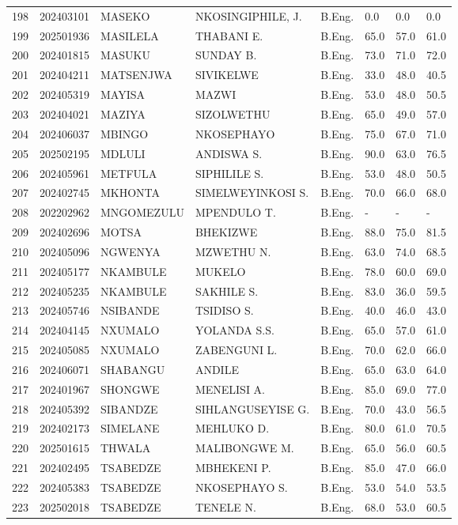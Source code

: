 \documentclass[12pt]{article}
\begin{document}
\begin{longtable}{@{}llllllll@{}}
198 & 202403101 & MASEKO & NKOSINGIPHILE, J. & B.Eng. & 0.0 & 0.0 & 0.0 \\
199 & 202501936 & MASILELA & THABANI E. & B.Eng. & 65.0 & 57.0 & 61.0 \\
200 & 202401815 & MASUKU & SUNDAY B. & B.Eng. & 73.0 & 71.0 & 72.0 \\
201 & 202404211 & MATSENJWA & SIVIKELWE & B.Eng. & 33.0 & 48.0 & 40.5 \\
202 & 202405319 & MAYISA & MAZWI & B.Eng. & 53.0 & 48.0 & 50.5 \\
203 & 202404021 & MAZIYA & SIZOLWETHU & B.Eng. & 65.0 & 49.0 & 57.0 \\
204 & 202406037 & MBINGO & NKOSEPHAYO & B.Eng. & 75.0 & 67.0 & 71.0 \\
205 & 202502195 & MDLULI & ANDISWA S. & B.Eng. & 90.0 & 63.0 & 76.5 \\
206 & 202405961 & METFULA & SIPHILILE S. & B.Eng. & 53.0 & 48.0 & 50.5 \\
207 & 202402745 & MKHONTA & SIMELWEYINKOSI S. & B.Eng. & 70.0 & 66.0 & 68.0 \\
208 & 202202962 & MNGOMEZULU & MPENDULO T. & B.Eng. & - & - & - \\
209 & 202402696 & MOTSA & BHEKIZWE & B.Eng. & 88.0 & 75.0 & 81.5 \\
210 & 202405096 & NGWENYA & MZWETHU N. & B.Eng. & 63.0 & 74.0 & 68.5 \\
211 & 202405177 & NKAMBULE & MUKELO & B.Eng. & 78.0 & 60.0 & 69.0 \\
212 & 202405235 & NKAMBULE & SAKHILE S. & B.Eng. & 83.0 & 36.0 & 59.5 \\
213 & 202405746 & NSIBANDE & TSIDISO S. & B.Eng. & 40.0 & 46.0 & 43.0 \\
214 & 202404145 & NXUMALO & YOLANDA S.S. & B.Eng. & 65.0 & 57.0 & 61.0 \\
215 & 202405085 & NXUMALO & ZABENGUNI L. & B.Eng. & 70.0 & 62.0 & 66.0 \\
216 & 202406071 & SHABANGU & ANDILE & B.Eng. & 65.0 & 63.0 & 64.0 \\
217 & 202401967 & SHONGWE & MENELISI A. & B.Eng. & 85.0 & 69.0 & 77.0 \\
218 & 202405392 & SIBANDZE & SIHLANGUSEYISE G. & B.Eng. & 70.0 & 43.0 & 56.5 \\
219 & 202402173 & SIMELANE & MEHLUKO D. & B.Eng. & 80.0 & 61.0 & 70.5 \\
220 & 202501615 & THWALA & MALIBONGWE M. & B.Eng. & 65.0 & 56.0 & 60.5 \\
221 & 202402495 & TSABEDZE & MBHEKENI P. & B.Eng. & 85.0 & 47.0 & 66.0 \\
222 & 202405383 & TSABEDZE & NKOSEPHAYO S. & B.Eng. & 53.0 & 54.0 & 53.5 \\
223 & 202502018 & TSABEDZE & TENELE N. & B.Eng. & 68.0 & 53.0 & 60.5 \\


\end{longtable}
\end{document}
